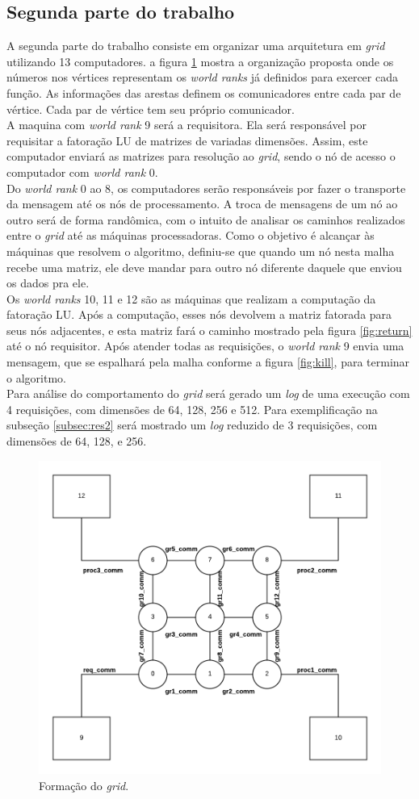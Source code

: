 \documentclass[12pt]{article}
\newcommand\tab[1][1cm]{\hspace*{#1}}
\begin{document}
\subsection{Segunda parte do trabalho}\label{subsec:prop2}
\tab A segunda parte do trabalho consiste em organizar uma arquitetura em \textit{grid} utilizando 13 computadores. a figura \ref{fig:grid} mostra a organização proposta onde os números nos vértices representam os \textit{world ranks} já definidos para exercer cada função. As informações das arestas definem os comunicadores entre cada par de vértice. Cada par de vértice tem seu próprio comunicador.
\\
\tab A maquina com \textit{world rank} 9 será a requisitora. Ela será responsável por requisitar a fatoração LU de matrizes de variadas dimensões. Assim, este computador enviará as matrizes para resolução ao \textit{grid}, sendo o nó de acesso o computador com \textit{world rank} 0. 
\\
\tab Do \textit{world rank} 0 ao 8, os computadores serão responsáveis por fazer o transporte da mensagem até os nós de processamento. A troca de mensagens de um nó ao outro será de forma randômica, com o intuito de analisar os caminhos realizados entre o \textit{grid} até as máquinas processadoras. Como o objetivo é alcançar às máquinas que resolvem o algoritmo, definiu-se que quando um nó nesta malha recebe uma matriz, ele deve mandar para outro nó diferente daquele que enviou os dados pra ele.
\\
\tab Os \textit{world ranks} 10, 11 e 12 são as máquinas que realizam a computação da fatoração LU. Após a computação, esses nós devolvem a matriz fatorada para seus nós adjacentes, e esta matriz fará o caminho mostrado pela figura \ref{fig:return} até o nó requisitor. Após atender todas as requisições, o \textit{world rank} 9 envia uma mensagem, que se espalhará pela malha conforme a figura \ref{fig:kill}, para terminar o algoritmo.
\\
\tab Para análise do comportamento do \textit{grid} será gerado um \textit{log} de uma execução com 4 requisições, com dimensões de 64, 128, 256 e 512. Para exemplificação na subseção \ref{subsec:res2} será mostrado um \textit{log} reduzido de 3 requisições, com dimensões de 64, 128, e 256.
\begin{figure}[ht]
\centering
\includegraphics[width=.5\textwidth]{grid-comm.png}
\caption{Formação do \textit{grid}.}
\label{fig:grid}
\end{figure}
\end{document}
